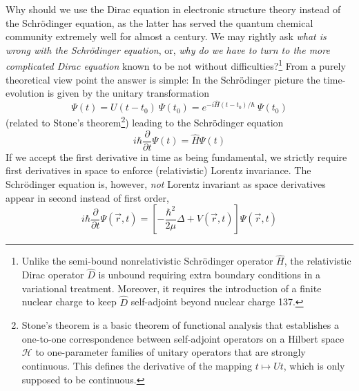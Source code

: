 \documentclass[12pt]{article}
\begin{document}
Why should we use the Dirac equation in electronic structure theory instead of the Schr\"odinger equation, as the latter has served the quantum chemical community extremely well for almost a century. We may rightly ask {\it what is wrong with the Schr\"odinger equation}, or, {\it why do we have to turn to the more complicated Dirac equation} known to be not without difficulties?\footnote{Unlike the semi-bound nonrelativistic Schr\"odinger operator $\hat{H}$, the relativistic Dirac operator $\hat{D}$ is unbound requiring extra boundary conditions in a variational treatment. Moreover, it requires the introduction of a finite nuclear charge to keep $\hat{D}$ self-adjoint beyond nuclear charge 137.} From a purely theoretical view point the answer is simple: In the Schr\"odinger picture the time-evolution is given by the unitary transformation
\begin{equation}
   \Psi (t) = U(t-t_0) ~\Psi (t_0) = e^{-i\hat{H}(t-t_0)/\hbar} ~\Psi (t_0)
   \label{timeevo}
\end{equation}
(related to Stone's theorem\footnote{Stone's theorem is a basic theorem of functional analysis that establishes a one-to-one correspondence between self-adjoint operators on a Hilbert space $\mathcal{H}$ to one-parameter families of unitary operators that are strongly continuous. This defines the derivative of the mapping $t\mapsto Ut$, which is only supposed to be continuous.}) leading to the Schr\"odinger equation
\begin{equation}
   i \hbar \frac{\partial}{\partial t} \Psi (t) = \hat{H} \Psi (t)
   \label{Schrodinger}
\end{equation}
If we accept the first derivative in time as being fundamental, we strictly require first derivatives in space to enforce (relativistic) Lorentz invariance. The Schr\"odinger equation is, however, {\it not} Lorentz invariant as space derivatives appear in second instead of first order,
\begin{equation}
   i \hbar \frac{\partial}{\partial t} \Psi (\vec{r},t) = \left[ -\frac{\hbar^2}{2\mu} \Delta + V(\vec{r},t)\right] \Psi (\vec{r},t)
   \label{Schrodinger1}
\end{equation}
\end{document}
